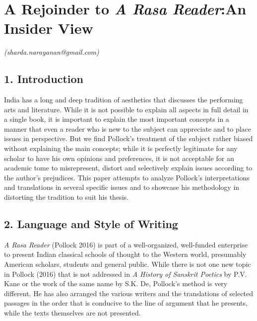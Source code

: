 
\chapter{\hspace{2.17cm} A Rejoinder to \textit{A Rasa Reader}:\break An Insider View}\label{chapter9}



\begin{flushright}
\textit{(sharda.narayanan@gmail.com)}
\end{flushright}


\section*{1. Introduction}

India has a long and deep tradition of aesthetics that discusses the performing arts and literature. While it is not possible to explain all aspects in full detail in a single book, it is important to explain the most important concepts in a manner that even a reader who is new to the subject can appreciate and to place issues in perspective. But we find Pollock’s treatment of the subject rather biased without explaining the main concepts; while it is perfectly legitimate for any scholar to have his own opinions and preferences, it is not acceptable for an academic tome to misrepresent, distort and selectively explain issues according to the author’s prejudices. This paper attempts to analyze Pollock’s interpretations and translations in several specific issues and to showcase his methodology in distorting the tradition to suit his thesis.


\section*{2. Language and Style of Writing}

\textit{A Rasa Reader} (Pollock 2016) is part of a well-organized, well-funded enterprise to present Indian classical schools of thought to the Western world, presumably American scholars, students and general public. While there is not one new topic in Pollock (2016) that is not addressed in \textit{A History of Sanskrit Poetics} by P.V. Kane or the work of the same name by S.K. De, Pollock’s method is very different. He has also arranged the various writers and the translations of selected passages in the order that is conducive to the line of argument that he presents, while the texts themselves are not presented.

